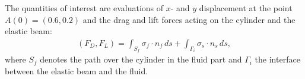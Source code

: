 The quantities of interest are evaluations of 
$x$- and $y$ displacement at the point $A(0) = (0.6,0.2)$
and the drag and lift forces acting on the cylinder and the elastic beam:
\begin{align}
\label{drag_lift_forces}
(F_D , F_L) 
= {\int_{S_f} \sigma_f \cdot n_f \, ds + 
\int_{\Gamma_i} \sigma_s \cdot n_s \, ds},
\end{align}
where $S_{f}$ denotes the path over the cylinder in the fluid part and
$\Gamma_i$ the interface between the elastic beam and the 
fluid.

% 
%
%
